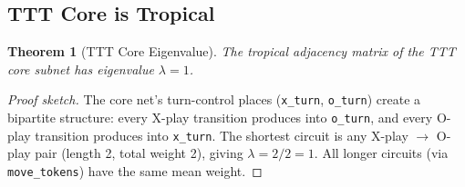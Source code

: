 \documentclass[11pt,a4paper]{article}
\newtheorem{theorem}{Theorem}
\begin{document}
\subsection{TTT Core is Tropical}

\begin{theorem}[TTT Core Eigenvalue]
\label{thm:ttt-eigenvalue}
The tropical adjacency matrix of the TTT core subnet has eigenvalue $\lambda = 1$.
\end{theorem}

\begin{proof}[Proof sketch]
The core net's turn-control places (\texttt{x\_turn}, \texttt{o\_turn}) create a bipartite structure: every X-play transition produces into \texttt{o\_turn}, and every O-play transition produces into \texttt{x\_turn}.
The shortest circuit is any X-play $\to$ O-play pair (length 2, total weight 2), giving $\lambda = 2/2 = 1$.
All longer circuits (via \texttt{move\_tokens}) have the same mean weight.
\end{proof}
\end{document}
